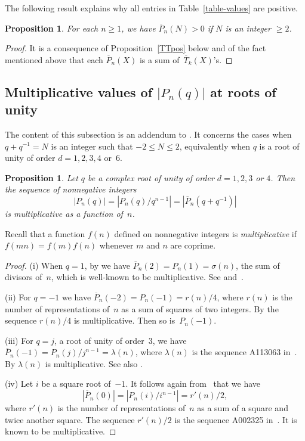 \documentclass[11pt, a4paper]{amsart}
\newtheorem{prop}[theorem]{Proposition}
\theoremstyle{definition}
\newcommand\Pg{\overline{P}}
\newcommand\TT{\overline{T}}
\numberwithin{equation}{section}
\begin{document}
The following result explains why all entries in Table~\ref{table-values} are positive.

\begin{prop}
For each $n \geq 1$, we have $\Pg_n(N) > 0$ if $N$ is an integer $\geq 2$.
\end{prop}

\begin{proof}
It is a consequence of Proposition~\ref{TTpos} below and 
of the fact mentioned above that each $\Pg_n(X)$ is a sum of~$\TT_k(X)$'s.
\end{proof}

\subsection{Multiplicative values of $|P_n(q)|$ at roots of unity}\label{ssec-mult}

The content of this subsection is an addendum to \cite[Th.\,1.6]{KR3}. It concerns the cases when $q + q^{-1} = N$
is an integer such that $-2 \leq N \leq 2$, 
equivalently when $q$ is a root of unity of order $d = 1, 2, 3, 4$ or~$6$. 

\begin{prop}\label{prop-mult}
Let $q$ be a complex root of unity of order $d = 1, 2, 3$ or $4$. 
Then the sequence of nonnegative integers 
\begin{equation*}
\left |P_n(q) \right |  = \left | P_n(q)/q^{n-1} \right | =  \left |\Pg_n(q + q^{-1}) \right |
\end{equation*}
is multiplicative as a function of~$n$.
\end{prop}

Recall that a function $f(n)$ defined on nonnegative integers is \emph{multiplicative}  if $f(mn) = f(m) f(n)$ 
whenever $m$ and $n$ are coprime.

\begin{proof}
(i) When $q = 1$, by \cite[Cor.\, 1.2]{KR2} we have $\Pg_n(2) = P_n(1) = \sigma(n)$, the sum of divisors of~$n$,
which is well-known to be multiplicative. See \cite[Sect.\,2.13]{Ap} and~\cite[A000203]{OEIS}.

(ii) For $q = -1$ we have $\Pg_n(-2) = P_n(-1) = r(n)/4$, where $r(n)$ is the number of representations of~$n$ 
as a sum of squares of two integers. By \cite[A002654]{OEIS} the sequence $r(n)/4$ is multiplicative. 
Then so is~$P_n(-1)$.

(iii) For $q = j$, a root of unity of order~$3$, we have
$\Pg_n(-1) = P_n(j)/j^{n-1} = \lambda(n)$, where $\lambda(n)$ is the sequence A113063 in~\cite{OEIS}.
By \cite[Sect.\,32, p.\,79]{Fi} $\lambda(n)$ is multiplicative. See also \cite{RC2}.

(iv) Let $i$ be a square root of~$-1$. It follows again from~\cite[Th.\,1.6]{KR3} that we have
\[
|\Pg_n(0)| = |P_n(i)/i^{n-1}| = r'(n)/2,
\] 
where $r'(n)$ is the number of representations of~$n$ as a sum of a
square and twice another square. The sequence $r'(n)/2$ is the sequence A002325 in~\cite{OEIS}.
It is known to be multiplicative.
\end{proof}
\end{document}
